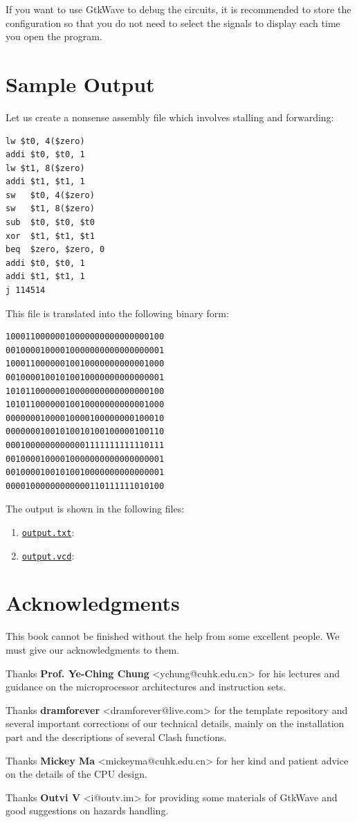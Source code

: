 \documentclass[a4paper,12pt, oneside]{book}
\begin{document}
If you want to use GtkWave to debug the circuits, it is recommended to store the configuration so that you do not need to select the signals to display each time you open the program.

\chapter{Sample Output}
Let us create a nonsense assembly file which involves stalling and forwarding:
\begin{verbatim}
lw $t0, 4($zero)
addi $t0, $t0, 1
lw $t1, 8($zero)
addi $t1, $t1, 1
sw   $t0, 4($zero)
sw   $t1, 8($zero)
sub  $t0, $t0, $t0
xor  $t1, $t1, $t1
beq  $zero, $zero, 0
addi $t0, $t0, 1
addi $t1, $t1, 1
j 114514
\end{verbatim}
This file is translated into the following binary form:
\begin{verbatim}
10001100000010000000000000000100
00100001000010000000000000000001
10001100000010010000000000001000
00100001001010010000000000000001
10101100000010000000000000000100
10101100000010010000000000001000
00000001000010000100000000100010
00000001001010010100100000100110
00010000000000001111111111110111
00100001000010000000000000000001
00100001001010010000000000000001
00001000000000000110111111010100
\end{verbatim}
The output is shown in the following files:
\begin{enumerate}
	\item \href{https://yifan.cowtransfer.com/s/166018e0ad394b}{\texttt{output.txt}}: 
	\item \href{https://yifan.cowtransfer.com/s/e10ff6693c3149}{\texttt{output.vcd}}: 
\end{enumerate}
\chapter{Acknowledgments}
This book cannot be finished without the help from some excellent people. We must give our acknowledgments to them.

Thanks \textbf{Prof. Ye-Ching Chung} <ychung@cuhk.edu.cn> for his lectures and guidance on the microprocessor architectures and instruction sets.

Thanks \textbf{dramforever} <dramforever@live.com> for the template repository and several important corrections of our technical details, mainly on the installation part and the descriptions of several Clash functions.

Thanks \textbf{Mickey Ma} <mickeyma@cuhk.edu.cn> for her kind and patient advice on the details of the CPU design.

Thanks \textbf{Outvi V} <i@outv.im> for providing some materials of GtkWave and good suggestions on hazards handling.
\end{document}
